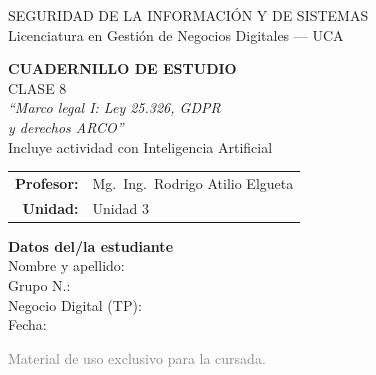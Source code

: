 \documentclass[12pt,a4paper]{article}
\begin{document}
\begin{titlepage}
\centering
\vspace*{1cm}

\begin{cajaTitulo}[width=\textwidth, halign=center]
  SEGURIDAD DE LA INFORMACI\'ON Y DE SISTEMAS\\[4pt]
  {\large Licenciatura en Gesti\'on de Negocios Digitales --- UCA}
\end{cajaTitulo}

\vspace{1.5cm}

{\Huge\bfseries\color{azulUCA} CUADERNILLO DE ESTUDIO}\\[8pt]
{\LARGE\color{doradoUCA} CLASE 8}\\[12pt]
{\Large\itshape ``Marco legal I: Ley 25.326, GDPR\\[2pt] y derechos ARCO''}\\[6pt]
{\large\color{violetaIA}\; Incluye actividad con Inteligencia Artificial}\\[1.5cm]

\begin{tabular}{rl}
\textbf{Profesor:}   & Mg.\ Ing.\ Rodrigo Atilio Elgueta \\[4pt]
\textbf{Unidad:}     & Unidad 3 \\[4pt]
\end{tabular}

\vfill

\begin{tcolorbox}[colback=grisClaro, colframe=azulUCA, arc=3mm, width=0.9\textwidth]
  \centering
  {\bfseries Datos del/la estudiante}\\[10pt]
  Nombre y apellido: \underline{\hspace{5cm}}\\[10pt]
  Grupo N.\textdegree: \underline{\hspace{5cm}}\\[10pt]
  Negocio Digital (TP): \underline{\hspace{5cm}}\\[10pt]
  Fecha: \underline{\hspace{5cm}}
\end{tcolorbox}

\vspace{1cm}
{\small\textcolor{gray}{Material de uso exclusivo para la cursada.}}
\end{titlepage}
\end{document}
